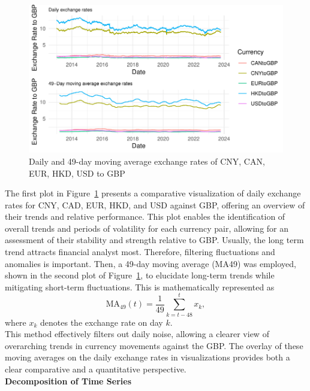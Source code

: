 \documentclass{article}\usepackage[]{graphicx}\usepackage[]{xcolor}
\makeatletter
\def\maxwidth{ %
  \ifdim\Gin@nat@width>\linewidth
    \linewidth
  \else
    \Gin@nat@width
  \fi
}
\newenvironment{knitrout}{}{} %
\makeatother
\begin{document}
\begin{figure}[H]
\begin{knitrout}
{\centering \includegraphics[width=\maxwidth]{figure/beamer-unnamed-chunk-2-1} 

}


\end{knitrout}
\centering
\caption{Daily and 49-day moving average exchange rates of CNY, CAN, EUR, HKD, USD to GBP}
\label{fig:all exchange rates}
\end{figure}

\noindent
The first plot in Figure~\ref{fig:all exchange rates} presents a comparative visualization of daily exchange rates for CNY, CAD, EUR, HKD, and USD against GBP, offering an overview of their trends and relative performance. This plot enables the identification of overall trends and periods of volatility for each currency pair, allowing for an assessment of their stability and strength relative to GBP. Usually, the long term trend attracts financial analyst most. Therefore, filtering fluctuations and anomalies is important. Then, a 49-day moving average (MA49) was employed, shown in the second plot of Figure~\ref{fig:all exchange rates}, to elucidate long-term trends while mitigating short-term fluctuations. This is mathematically represented as 
\[\text{MA}_{49}(t) = \frac{1}{49} \sum_{k=t-48}^{t} x_k,\] 
where \( x_k \) denotes the exchange rate on day $k$.\\

\noindent
This method effectively filters out daily noise, allowing a clearer view of overarching trends in currency movements against the GBP. The overlay of these moving averages on the daily exchange rates in visualizations provides both a clear comparative and a quantitative perspective.\\

\noindent
\textbf{Decomposition of Time Series}\\
\end{document}
